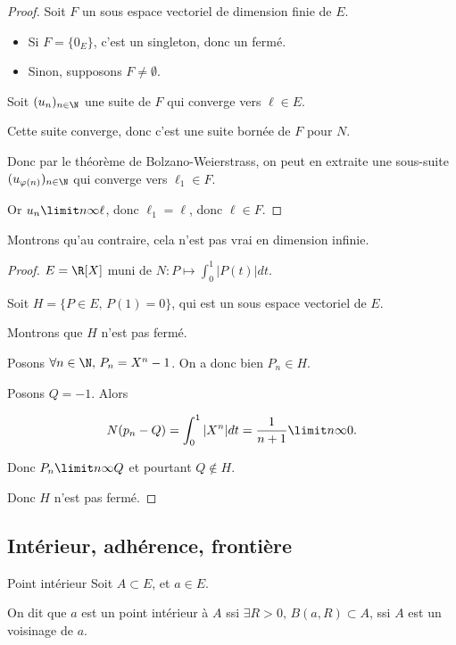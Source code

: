 \begin{proof}
    Soit $F$ un sous espace vectoriel de dimension finie de $E$. 

    \begin{itemize}
        \item Si $F = \{0_E\}$, c'est un singleton, donc un fermé.
        \item Sinon, supposons $F \neq \emptyset$. 
    \end{itemize}

    Soit $(u_n)_{n \in \N}$ une suite de $F$ qui converge vers $\ell \in E$.

    Cette suite converge, donc c'est une suite bornée de $F$ pour $N$. 

    Donc par le théorème de Bolzano-Weierstrass, on peut en extraite une sous-suite $(u_{\varphi(n)})_{n \in \N}$ qui converge vers
    $\ell_1 \in F$.

    Or $u_n \limit n \infty \ell$, donc $\ell_1 = \ell$, donc $\ell \in F$.
\end{proof}

Montrons qu'au contraire, cela n'est pas vrai en dimension infinie.

\begin{proof}
    $E = \R [X]$ muni de $N: P \mapsto \int_{0}^1 |P(t)| dt$.

    Soit $H = \{P \in E, \, P(1) = 0\}$, qui est un sous espace vectoriel de $E$.

    Montrons que $H$ n'est pas fermé.

    Posons $\forall n \in \N, \, P_n = X^n - 1$. On a donc bien $P_n \in H$.

    Posons $Q = -1$. Alors 

    $$ N(p_n - Q ) = \int_0^1 |X^n| dt = \frac 1 {n+1} \limit n \infty 0.$$

    Donc $P_n \limit n \infty Q$ et pourtant $Q \not \in H$.

    Donc $H$ n'est pas fermé.
\end{proof}

\subsection{Intérieur, adhérence, frontière}

\begin{definition}{Point intérieur}{}
    Soit $A \subset E$, et $a \in E$.

    On dit que $a$ est un point intérieur à $A$ ssi $\exists R > 0, \, B(a, R) \subset A$,
    ssi $A$ est un voisinage de $a$. 
\end{definition}



